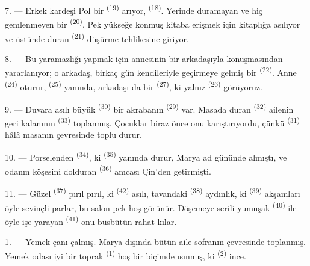 \VUsaut{5.0mm}
\VUsaut{3.0mm}

7. --- Erkek kardeşi Pol bir  \textsuperscript{(19)} arıyor,
 \textsuperscript{(18)}. Yerinde duramayan ve hiç
gemlenmeyen bir  \textsuperscript{(20)}. Pek yükseğe konmuş
kitaba erişmek için kitaplığa asılıyor ve üstünde duran 
\textsuperscript{(21)} düşürme tehlikesine giriyor.

8. --- Bu yaramazlığı yapmak için annesinin bir arkadaşıyla konuşmasından
yararlanıyor; o arkadaş, birkaç gün kendileriyle geçirmeye gelmiş bir
 \textsuperscript{(22)}. Anne 
\textsuperscript{(24)} oturur,  \textsuperscript{(25)}
yanında, arkadaşı da bir  \textsuperscript{(27)}, ki yalnız
 \textsuperscript{(26)} görüyoruz.

9. --- Duvara asılı büyük  \textsuperscript{(30)} bir
akrabanın  \textsuperscript{(29)} var. Masada duran
 \textsuperscript{(32)} ailenin geri kalanının
 \textsuperscript{(33)} toplanmış. Çocuklar biraz önce
onu karıştırıyordu, çünkü  \textsuperscript{(31)} hâlâ
masanın çevresinde toplu durur.

10. --- Porselenden  \textsuperscript{(34)}, ki
 \textsuperscript{(35)} yanında durur, Marya ad
gününde almıştı, ve odanın köşesini dolduran 
\textsuperscript{(36)} amcası Çin'den getirmişti.

11. --- Güzel  \textsuperscript{(37)} pırıl pırıl, ki
 \textsuperscript{(42)} asılı, tavandaki 
\textsuperscript{(38)} aydınlık, ki 
\textsuperscript{(39)} akşamları öyle sevinçli parlar, bu salon pek hoş
görünür. Döşemeye serili yumuşak  \textsuperscript{(40)} ile öyle
işe yarayan  \textsuperscript{(41)} onu büsbütün rahat
kılar.

\VUsaut{3.6mm}
\VUsaut{3.0mm}

1. --- Yemek çanı çalmış. Marya dışında bütün aile sofranın çevresinde
toplanmış. Yemek odası iyi bir toprak  \textsuperscript{(1)} hoş bir
biçimde ısınmış, ki  \textsuperscript{(2)} ince.

